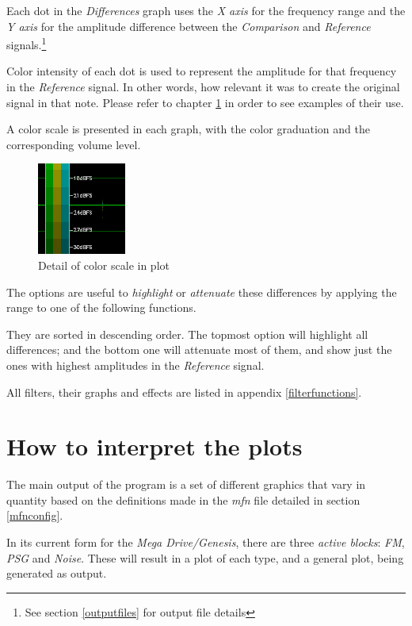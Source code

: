 \documentclass[10pt,a4paper]{report}
\begin{document}
Each dot in the \textit{Differences} graph uses the \textit{X axis} for the frequency range and the \textit{Y axis} for the amplitude difference between the \textit{Comparison} and \textit{Reference} signals.\footnote{See section \ref{outputfiles} for output file details}

Color intensity of each dot is used to represent the amplitude for that frequency in the \textit{Reference} signal. In other words, how relevant it was to create the original signal in that note. Please refer to chapter \ref{howtoplots} in order to see examples of their use.

A color scale is presented in each graph, with the color graduation and the corresponding volume level.

\begin{figure}[H]
	\centering
	\includegraphics[width=0.2\linewidth]{plots/colorscale.png}
	\caption{Detail of color scale in plot}
	\label{fig:colorscale}
\end{figure}


The options are useful to \textit{highlight} or \textit{attenuate} these differences by applying the range to one of the following functions. 

They are sorted in descending order. The topmost option will highlight all differences; and the bottom one will attenuate most of them, and show just the ones with highest amplitudes in the \textit{Reference} signal.

All filters, their graphs and effects are listed in appendix \ref{filterfunctions}.

\chapter{How to interpret the plots}
\label{howtoplots}

The main output of the program is a set of different graphics that vary in quantity based on the definitions made in the \textit{mfn} file detailed in section \ref{mfnconfig}.

In its current form for the \textit{Mega Drive/Genesis}, there are three \textit{active blocks}: \textit{FM}, \textit{PSG} and \textit{Noise}. These will result in a plot of each type, and a general plot, being generated as output.
\end{document}
